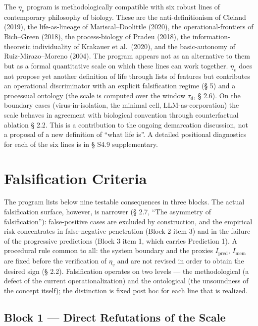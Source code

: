 \documentclass[pdflatex,sn-mathphys-ay]{sn-jnl}
\begin{document}
The \(\eta_v\) program is methodologically compatible with six robust lines of contemporary philosophy of biology. These are the anti-definitionism of Cleland (2019), the life-as-lineage of Mariscal--Doolittle (2020), the operational-frontiers of Bich--Green (2018), the process-biology of Pradeu (2018), the information-theoretic individuality of Krakauer et al.~(2020), and the basic-autonomy of Ruiz-Mirazo--Moreno (2004). The program appears not as an alternative to them but as a formal quantitative scale on which these lines can work together. \(\eta_v\) does not propose yet another definition of life through lists of features but contributes an operational discriminator with an explicit falsification regime (§ 5) and a processual ontology (the scale is computed over the window \(\tau_d\), § 2.6). On the boundary cases (virus-in-isolation, the minimal cell, LLM-as-corporation) the scale behaves in agreement with biological convention through counterfactual ablation § 2.2. This is a contribution to the ongoing demarcation discussion, not a proposal of a new definition of ``what life is''. A detailed positional diagnostics for each of the six lines is in § S4.9 supplementary.

\section{Falsification Criteria}\label{falsification-criteria}

The program lists below nine testable consequences in three blocks. The actual falsification surface, however, is narrower (§ 2.7, ``The asymmetry of falsification''): false-positive cases are excluded by construction, and the empirical risk concentrates in false-negative penetration (Block 2 item 3) and in the failure of the progressive predictions (Block 3 item 1, which carries Prediction 1). A procedural rule common to all: the system boundary and the proxies \(I_{\text{pred}}\), \(I_{\text{mem}}\) are fixed before the verification of \(\eta_v\) and are not revised in order to obtain the desired sign (§ 2.2). Falsification operates on two levels --- the methodological (a defect of the current operationalization) and the ontological (the unsoundness of the concept itself); the distinction is fixed post hoc for each line that is realized.

\subsection{Block 1 --- Direct Refutations of the Scale}\label{block-1-direct-refutations-of-the-scale}
\end{document}
